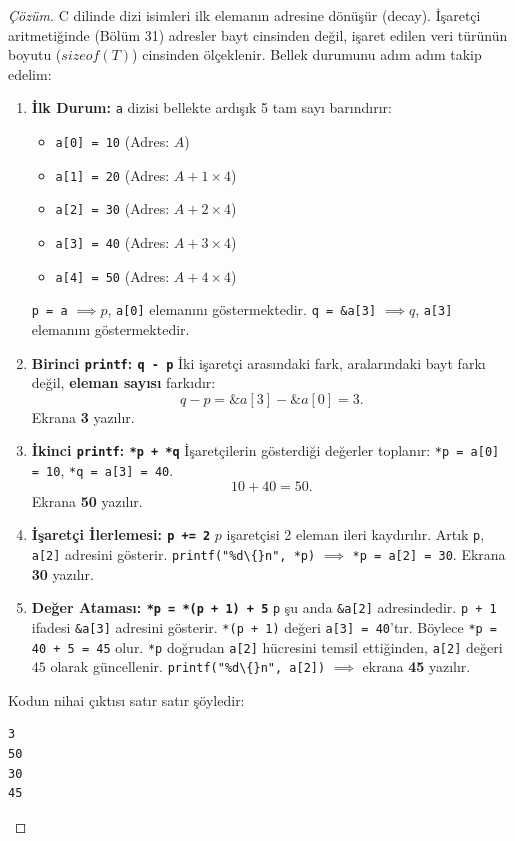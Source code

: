 \begin{proof}[Çözüm]
C dilinde dizi isimleri ilk elemanın adresine dönüşür (decay). İşaretçi aritmetiğinde (Bölüm 31) adresler bayt cinsinden değil, işaret edilen veri türünün boyutu ($sizeof(T)$) cinsinden ölçeklenir. Bellek durumunu adım adım takip edelim:

\begin{enumerate}
    \item \textbf{İlk Durum:}
    \texttt{a} dizisi bellekte ardışık 5 tam sayı barındırır:
    \begin{itemize}
        \item \texttt{a[0] = 10} (Adres: $A$)
        \item \texttt{a[1] = 20} (Adres: $A + 1 \times 4$)
        \item \texttt{a[2] = 30} (Adres: $A + 2 \times 4$)
        \item \texttt{a[3] = 40} (Adres: $A + 3 \times 4$)
        \item \texttt{a[4] = 50} (Adres: $A + 4 \times 4$)
    \end{itemize}
    \texttt{p = a} $\implies p$, \texttt{a[0]} elemanını göstermektedir.
    \texttt{q = \&a[3]} $\implies q$, \texttt{a[3]} elemanını göstermektedir.

    \item \textbf{Birinci \texttt{printf}: \texttt{q - p}}
    İki işaretçi arasındaki fark, aralarındaki bayt farkı değil, \textbf{eleman sayısı} farkıdır:
    \[
    q - p = \&a[3] - \&a[0] = 3.
    \]
    Ekrana \textbf{3} yazılır.

    \item \textbf{İkinci \texttt{printf}: \texttt{*p + *q}}
    İşaretçilerin gösterdiği değerler toplanır:
    \texttt{*p = a[0] = 10}, \texttt{*q = a[3] = 40}.
    \[
    10 + 40 = 50.
    \]
    Ekrana \textbf{50} yazılır.

    \item \textbf{İşaretçi İlerlemesi: \texttt{p += 2}}
    $p$ işaretçisi 2 eleman ileri kaydırılır. Artık \texttt{p}, \texttt{a[2]} adresini gösterir.
    \texttt{printf("\%d\textbackslash\{\}n", *p)} $\implies$ \texttt{*p = a[2] = 30}.
    Ekrana \textbf{30} yazılır.

    \item \textbf{Değer Ataması: \texttt{*p = *(p + 1) + 5}}
    \texttt{p} şu anda \texttt{\&a[2]} adresindedir.
    \texttt{p + 1} ifadesi \texttt{\&a[3]} adresini gösterir.
    \texttt{*(p + 1)} değeri \texttt{a[3] = 40}'tır.
    Böylece \texttt{*p = 40 + 5 = 45} olur.
    \texttt{*p} doğrudan \texttt{a[2]} hücresini temsil ettiğinden, \texttt{a[2]} değeri $45$ olarak güncellenir.
    \texttt{printf("\%d\textbackslash\{\}n", a[2])} $\implies$ ekrana \textbf{45} yazılır.
\end{enumerate}

Kodun nihai çıktısı satır satır şöyledir:
\begin{verbatim}
3
50
30
45
\end{verbatim}
\end{proof}

